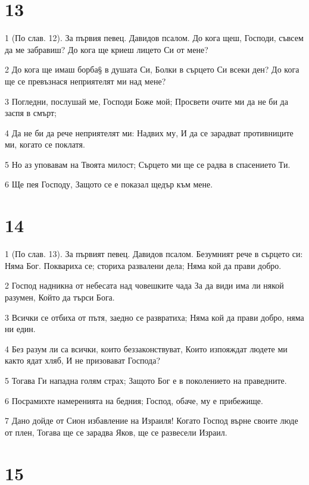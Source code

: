\chapter{13}

\par 1 (По слав. 12). За първия певец. Давидов псалом. До кога щеш, Господи, съвсем да ме забравиш? До кога ще криеш лицето Си от мене?
\par 2 До кога ще имаш борба§ в душата Си, Болки в сърцето Си всеки ден? До кога ще се превъзнася неприятелят ми над мене?
\par 3 Погледни, послушай ме, Господи Боже мой; Просвети очите ми да не би да заспя в смърт;
\par 4 Да не би да рече неприятелят ми: Надвих му, И да се зарадват противниците ми, когато се поклатя.
\par 5 Но аз уповавам на Твоята милост; Сърцето ми ще се радва в спасението Ти.
\par 6 Ще пея Господу, Защото се е показал щедър към мене.

\chapter{14}

\par 1 (По слав. 13). За първият певец. Давидов псалом. Безумният рече в сърцето си: Няма Бог. Поквариха се; сториха развалени дела; Няма кой да прави добро.
\par 2 Господ надникна от небесата над човешките чада За да види има ли някой разумен, Който да търси Бога.
\par 3 Всички се отбиха от пътя, заедно се развратиха; Няма кой да прави добро, няма ни един.
\par 4 Без разум ли са всички, които беззаконствуват, Които изпояждат людете ми както ядат хляб, И не призовават Господа?
\par 5 Тогава Ги нападна голям страх; Защото Бог е в поколението на праведните.
\par 6 Посрамихте намеренията на бедния; Господ, обаче, му е прибежище.
\par 7 Дано дойде от Сион избавление на Израиля! Когато Господ върне своите люде от плен, Тогава ще се зарадва Яков, ще се развесели Израил.

\chapter{15}

